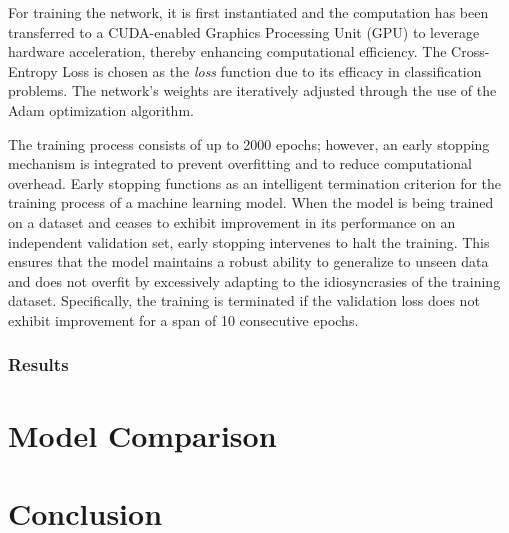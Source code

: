 For training the network, it is first instantiated and the computation has been transferred to a CUDA-enabled Graphics Processing Unit (GPU) to leverage hardware acceleration, thereby enhancing computational efficiency. The Cross-Entropy Loss is chosen as the \textit{loss} function due to its efficacy in classification problems. The network's weights are iteratively adjusted through the use of the Adam optimization algorithm.

The training process consists of up to 2000 epochs; however, an early stopping mechanism is integrated to prevent overfitting and to reduce computational overhead. Early stopping functions as an intelligent termination criterion for the training process of a machine learning model. When the model is being trained on a dataset and ceases to exhibit improvement in its performance on an independent validation set, early stopping intervenes to halt the training. This ensures that the model maintains a robust ability to generalize to unseen data and does not overfit by excessively adapting to the idiosyncrasies of the training dataset. 
Specifically, the training is terminated if the validation loss does not exhibit improvement for a span of 10 consecutive epochs.


\subsubsection{Results}


\section{Model Comparison}





\section{Conclusion}

